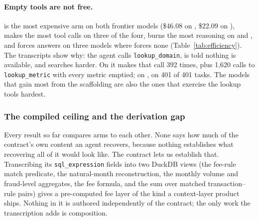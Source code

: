 \paragraph{Empty tools are not free.} \armH{} is the most expensive arm on
both frontier models (\$46.08 on \mSON{}, \$22.09 on \mGPT{}), makes the
most tool calls on three of the four, burns the most reasoning on \mGLM{}
and \mSON{}, and forces answers on three models where \armC{} forces none
(Table~\ref{tab:efficiency}). The transcripts show why: the agent calls
\texttt{lookup\_domain}, is told nothing is available, and searches harder.
On \mSON{} it makes that call 392 times, plus 1{,}620 calls to
\texttt{lookup\_metric} with every metric emptied; on \mGPT{}, on 401 of
401 tasks. The
models that gain most from the scaffolding are also the ones that exercise
the lookup tools hardest.

\subsubsection{The compiled ceiling and the derivation gap}
\label{app:buckets}

Every result so far compares arms to each other. None says how much of the
contract's own content an agent recovers, because nothing establishes what
recovering all of it would look like. The contract lets us establish that.
Transcribing its \texttt{sql\_expression} fields into two DuckDB views (the
fee-rule match predicate, the natural-month reconstruction, the monthly
volume and fraud-level aggregates, the fee formula, and the sum over matched
transaction--rule pairs) gives a pre-computed fee layer of the kind a
context-layer product ships. Nothing in it is authored independently of the
contract; the only work the transcription adds is composition.

